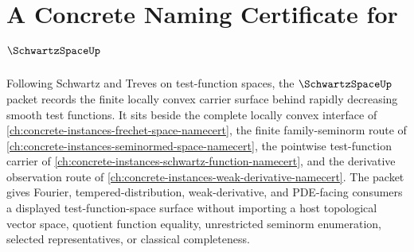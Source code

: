 \chapter{A Concrete Naming Certificate for $\SchwartzSpaceUp$}
\label{ch:concrete-instances-schwartz-space-namecert}

Following Schwartz and Treves on test-function spaces, the $\SchwartzSpaceUp$ packet records the finite locally convex carrier surface behind rapidly decreasing smooth test functions. It sits beside the complete locally convex interface of \autoref{ch:concrete-instances-frechet-space-namecert}, the finite family-seminorm route of \autoref{ch:concrete-instances-seminormed-space-namecert}, the pointwise test-function carrier of \autoref{ch:concrete-instances-schwartz-function-namecert}, and the derivative observation route of \autoref{ch:concrete-instances-weak-derivative-namecert}. The packet gives Fourier, tempered-distribution, weak-derivative, and PDE-facing consumers a displayed test-function-space surface without importing a host topological vector space, quotient function equality, unrestricted seminorm enumeration, selected representatives, or classical completeness.

